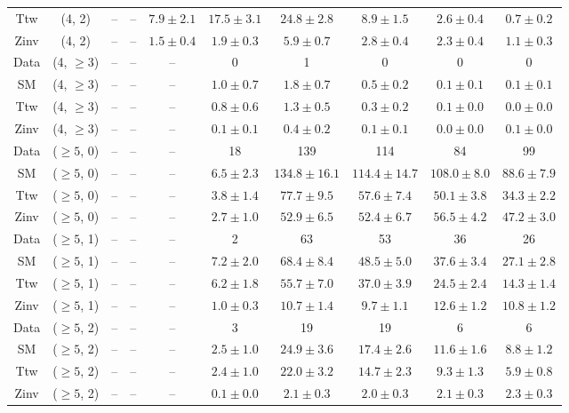 \begin{table}[h!]
{\begin{tabular}{cccccccccc}
	Ttw & (4, 2) & -- & -- & $7.9\pm 2.1$ & $17.5\pm 3.1$ & $24.8\pm 2.8$ & $8.9\pm 1.5$ & $2.6\pm 0.4$ & $0.7\pm 0.2$ \\[0.5ex] 
	Zinv & (4, 2) & -- & -- & $1.5\pm 0.4$ & $1.9\pm 0.3$ & $5.9\pm 0.7$ & $2.8\pm 0.4$ & $2.3\pm 0.4$ & $1.1\pm 0.3$ \\[0.5ex] 
	Data & (4, $\ge3$) & -- & -- & -- & 0 & 1 & 0 & 0 & 0 \\[0.5ex] 
	SM & (4, $\ge3$) & -- & -- & -- & $1.0\pm 0.7$ & $1.8\pm 0.7$ & $0.5\pm 0.2$ & $0.1\pm 0.1$ & $0.1\pm 0.1$ \\[0.5ex] 
	Ttw & (4, $\ge3$) & -- & -- & -- & $0.8\pm 0.6$ & $1.3\pm 0.5$ & $0.3\pm 0.2$ & $0.1\pm 0.0$ & $0.0\pm 0.0$ \\[0.5ex] 
	Zinv & (4, $\ge3$) & -- & -- & -- & $0.1\pm 0.1$ & $0.4\pm 0.2$ & $0.1\pm 0.1$ & $0.0\pm 0.0$ & $0.1\pm 0.0$ \\[0.5ex] 
	Data & ($\ge5$, 0) & -- & -- & -- & 18 & 139 & 114 & 84 & 99 \\[0.5ex] 
	SM & ($\ge5$, 0) & -- & -- & -- & $6.5\pm 2.3$ & $134.8\pm 16.1$ & $114.4\pm 14.7$ & $108.0\pm 8.0$ & $88.6\pm 7.9$ \\[0.5ex] 
	Ttw & ($\ge5$, 0) & -- & -- & -- & $3.8\pm 1.4$ & $77.7\pm 9.5$ & $57.6\pm 7.4$ & $50.1\pm 3.8$ & $34.3\pm 2.2$ \\[0.5ex] 
	Zinv & ($\ge5$, 0) & -- & -- & -- & $2.7\pm 1.0$ & $52.9\pm 6.5$ & $52.4\pm 6.7$ & $56.5\pm 4.2$ & $47.2\pm 3.0$ \\[0.5ex] 
	Data & ($\ge5$, 1) & -- & -- & -- & 2 & 63 & 53 & 36 & 26 \\[0.5ex] 
	SM & ($\ge5$, 1) & -- & -- & -- & $7.2\pm 2.0$ & $68.4\pm 8.4$ & $48.5\pm 5.0$ & $37.6\pm 3.4$ & $27.1\pm 2.8$ \\[0.5ex] 
	Ttw & ($\ge5$, 1) & -- & -- & -- & $6.2\pm 1.8$ & $55.7\pm 7.0$ & $37.0\pm 3.9$ & $24.5\pm 2.4$ & $14.3\pm 1.4$ \\[0.5ex] 
	Zinv & ($\ge5$, 1) & -- & -- & -- & $1.0\pm 0.3$ & $10.7\pm 1.4$ & $9.7\pm 1.1$ & $12.6\pm 1.2$ & $10.8\pm 1.2$ \\[0.5ex] 
	Data & ($\ge5$, 2) & -- & -- & -- & 3 & 19 & 19 & 6 & 6 \\[0.5ex] 
	SM & ($\ge5$, 2) & -- & -- & -- & $2.5\pm 1.0$ & $24.9\pm 3.6$ & $17.4\pm 2.6$ & $11.6\pm 1.6$ & $8.8\pm 1.2$ \\[0.5ex] 
	Ttw & ($\ge5$, 2) & -- & -- & -- & $2.4\pm 1.0$ & $22.0\pm 3.2$ & $14.7\pm 2.3$ & $9.3\pm 1.3$ & $5.9\pm 0.8$ \\[0.5ex] 
	Zinv & ($\ge5$, 2) & -- & -- & -- & $0.1\pm 0.0$ & $2.1\pm 0.3$ & $2.0\pm 0.3$ & $2.1\pm 0.3$ & $2.3\pm 0.3$ \\[0.5ex] 

\end{tabular}}
\end{table}
